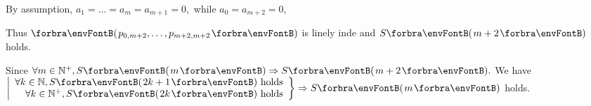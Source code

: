 {\vspace{4pt}By assumption, $a_1=\dots=a_m=a_{m+1}=0,$ while $a_0=a_{m+2}=0,$}\par\quad\Hii
\vspace{6pt}Thus $\Par{p_{0,m+2},\dots,p_{m+2,m+2}}$ is linely inde and $S\Par{m+2}$ holds.\par\quad
Since $\forall m\in\Nbp,S\Par{m}\Rightarrow S\Par{m+2}.$ We have \;$\hMath[0pt]{r}{\left|}{\right\}}{\forall k\in\Nbb,S\Par{2k+1}\text{ holds}\\\forall k\in\Nbp,S\Par{2k}\text{ holds}}\Rightarrow S\Par{m}$ holds.\PfEnd
\SepLine

